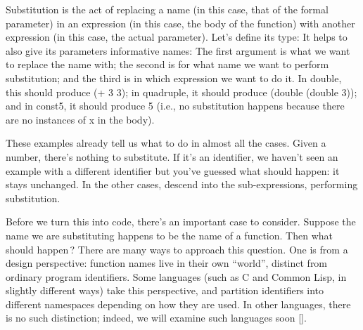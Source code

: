
Substitution is the act of replacing a name (in this case, that of the formal
parameter) in an expression (in this case, the body of the function) with another expression (in this case, the actual parameter). Let’s define its type:
It helps to also give its parameters informative names:
The first argument is what we want to replace the name with; the second is for
what name we want to perform substitution; and the third is in which expression
we want to do it.
In double, this should produce (+ 3 3); in quadruple, it should produce (double
(double 3)); and in const5, it should produce 5 (i.e., no substitution happens
because there are no instances of x in the body).

These examples already tell us what to do in almost all the cases. Given a
number, there’s nothing to substitute. If it’s an identifier, we haven’t seen an
example with a different identifier but you’ve guessed what should happen: it
stays unchanged. In the other cases, descend into the sub-expressions,
performing substitution.

Before we turn this into code, there’s an important case to consider. Suppose
the name we are substituting happens to be the name of a function. Then what
should happen\,?
There are many ways to approach this question. One is from a design perspective:
function names live in their own “world”, distinct from ordinary program
identifiers. Some languages (such as C and Common Lisp, in slightly different
ways) take this perspective, and partition identifiers into different namespaces
depending on how they are used. In other languages, there is no such
distinction; indeed, we will examine such languages soon \ref{}.

